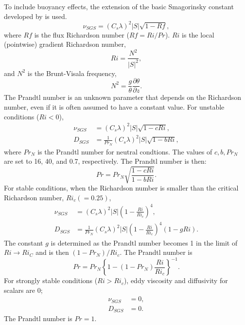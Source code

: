 To include buoyancy effects, the extension of the basic Smagorinsky constant developed by \citet{Brown_etal_1994}
is used.
\begin{equation}
  \nu_{SGS} = (C_s\lambda)^2 |S| \sqrt{1-Rf},
\end{equation}
where $Rf$ is the flux Richardson number ($Rf = Ri/Pr$).
$Ri$ is the local (pointwise) gradient Richardson number,
\begin{equation}
  Ri = \frac{N^2}{|S|^2},
  \label{eq:Ri}
\end{equation}
and $N^2$ is the Brunt-Visala frequency,
\begin{equation}
  N^2 = \frac{g}{\theta}\frac{\partial\theta}{\partial z}.
  \label{eq:N^2}
\end{equation}
The Prandtl number is an unknown parameter that depends on the Richardson number,
even if it is often assumed to have a constant value.
For  unstable conditions ($Ri < 0$),
\begin{align}
  \nu_{SGS} &= \left(C_s\lambda\right)^2 |S| \sqrt{1 - c Ri}, \label{eq:nu unstable} \\
  D_{SGS} &= \frac{1}{Pr_N} \left(C_s\lambda\right)^2 |S| \sqrt{1 - b Ri} \label{eq:nu^* unstable},
\end{align}
where $Pr_N$ is the Prandtl number for neutral condtions.
The values of $c, b, Pr_N$ are set to 16, 40, and 0.7, respectively.
The Prandtl number is then:
\begin{equation}
  Pr = Pr_N \sqrt{\frac{1-c Ri}{1-b Ri}}.
\end{equation}
For stable conditions, when the Richardson number is smaller than the critical Richardson number, $Ri_c (=0.25)$,
\begin{align}
  \nu_{SGS} &= \left(C_s\lambda\right)^2 |S| \left(1-\frac{Ri}{Ri_c}\right)^4, \label{eq:nu stable} \\
  D_{SGS} &= \frac{1}{Pr_N}\left(C_s\lambda\right)^2 |S| \left(1-\frac{Ri}{Ri_c}\right)^4\left(1-g Ri\right). \label{eq:nu^* stable}
\end{align}
The constant $g$ is determined as the Prandtl number becomes 1
in the limit of $Ri \to Ri_C$ and is then $(1-Pr_N)/Ri_c$.
The Prandtl number is
\begin{equation}
  Pr = Pr_N \left\{1-(1-Pr_N)\frac{Ri}{Ri_c}\right\}^{-1}.
\end{equation}
For  strongly stable conditions ($Ri > Ri_c$), eddy viscosity and diffusivity for scalars are 0;
\begin{align}
  \nu_{SGS} &= 0, \label{eq:nu strong stable} \\
  D_{SGS} &= 0. \label{eq:nu^* strong stable}
\end{align}
The Prandtl number is $Pr = 1$.


